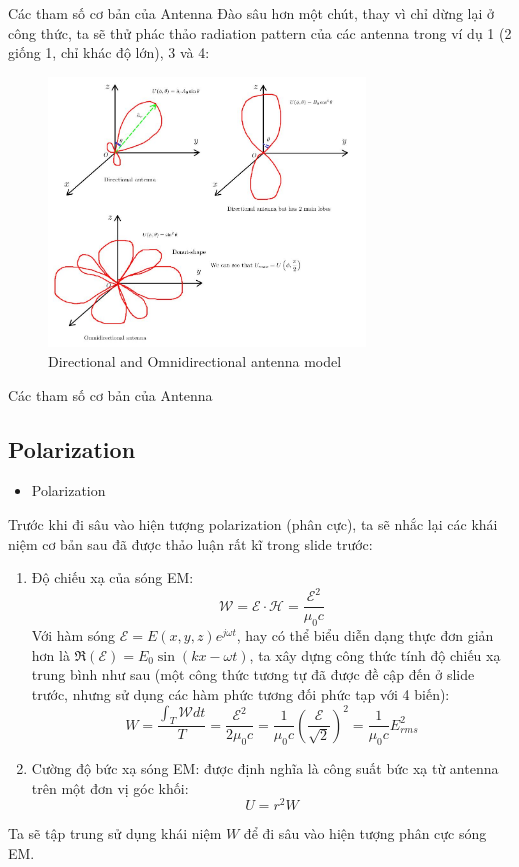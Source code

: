 \documentclass[8pt]{beamer}
\begin{document}
\begin{frame}{Các tham số cơ bản của Antenna}
Đào sâu hơn một chút, thay vì chỉ dừng lại ở công thức, ta sẽ thử phác thảo radiation pattern của các antenna trong ví dụ 1 (2 giống 1, chỉ khác độ lớn), 3 và 4:

\begin{figure}[h]
			\includegraphics[width=0.75\textwidth]{omni.jpg}
			\caption{Directional and Omnidirectional antenna model}			\label{fig:re2}
\end{figure}
\end{frame}
\begin{frame}{Các tham số cơ bản của Antenna}
\subsection{Polarization}
\begin{itemize}
	\item Polarization
\end{itemize}
Trước khi đi sâu vào hiện tượng polarization (phân cực), ta sẽ nhắc lại các khái niệm cơ bản sau đã được thảo luận rất kĩ trong slide trước:
\begin{enumerate}
	\item Độ chiếu xạ của sóng EM: $$\mathscr{W}=\mathscr{E}\cdot\mathscr{H}=\frac{\mathscr{E}^2}{\mu_{0}c}$$
		Với hàm sóng $\mathscr{E}=E(x,y,z)e^{j\omega t}$, hay có thể biểu diễn dạng thực đơn giản hơn là $\Re{(\mathscr{E})}=E_{0}\sin(kx-\omega t)$, ta xây dựng công thức tính độ chiếu xạ trung bình như sau (một công thức tương tự đã được đề cập đến ở slide trước, nhưng sử dụng các hàm phức tương đối phức tạp với 4 biến):
		$$W=\frac{\int_{T}\mathscr{W}dt}{T}=\frac{\mathscr{E}^2}{2\mu_{0}c}=\frac{1}{\mu_{0}c}\left(\frac{\mathscr{E}}{\sqrt{2}}\right)^2=\frac{1}{\mu_{0}c}E^2_{rms}$$
	\item Cường độ bức xạ sóng EM: được định nghĩa là công suất bức xạ từ antenna trên một đơn vị góc khối: $$U=r^2 W$$
\end{enumerate}
Ta sẽ tập trung sử dụng khái niệm $W$ để đi sâu vào hiện tượng phân cực sóng EM.
\end{frame}
\end{document}
